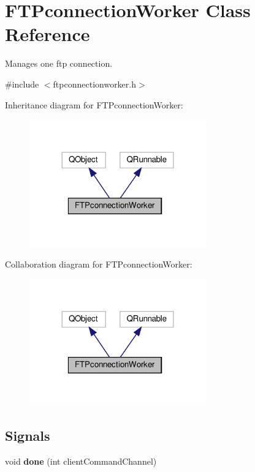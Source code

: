 \hypertarget{classFTPconnectionWorker}{}\section{F\+T\+Pconnection\+Worker Class Reference}
\label{classFTPconnectionWorker}


Manages one ftp connection.  




{\ttfamily \#include $<$ftpconnectionworker.\+h$>$}



Inheritance diagram for F\+T\+Pconnection\+Worker\+:\nopagebreak
\begin{figure}[H]
\begin{center}
\leavevmode
\includegraphics[width=216pt]{d2/df5/classFTPconnectionWorker__inherit__graph}
\end{center}
\end{figure}


Collaboration diagram for F\+T\+Pconnection\+Worker\+:\nopagebreak
\begin{figure}[H]
\begin{center}
\leavevmode
\includegraphics[width=216pt]{de/da8/classFTPconnectionWorker__coll__graph}
\end{center}
\end{figure}
\subsection*{Signals}
\begin{DoxyCompactItemize}
\item 
\mbox{\label{classFTPconnectionWorker_a0783b9741d75098496bfd7276d37a9ea}} 
void {\bfseries done} (int client\+Command\+Channel)
\end{DoxyCompactItemize}
